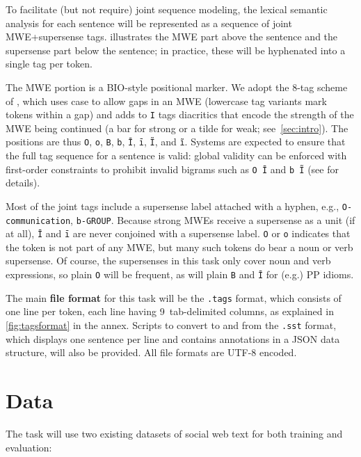 \documentclass[11pt]{article}
\newcommand{\shortversion}[1]{}
\newcommand{\longversion}[1]{#1} %
\begin{document}
\longversion{To facilitate (but not require) joint sequence modeling, 
the lexical semantic}\shortversion{The} analysis for each sentence will be represented as 
a sequence of joint MWE+supersense tags.  illustrates 
the MWE part above the sentence and the supersense part below\longversion{ the sentence}; 
in practice, these will be hyphenated into a single tag per token.

The MWE portion is a BIO-style \citep{ramshaw-95} 
positional marker. We adopt the 8-tag scheme of \citet{schneider-14}, 
which uses case to allow gaps in an MWE (lowercase tag variants mark 
tokens within a gap) and adds to \texttt{I} tags 
diacritics that encode the strength of the MWE being continued (a bar for strong or a tilde for weak; see~\cref{sec:intro}).
The positions are thus \texttt{O}, \texttt{o}, \texttt{B}, \texttt{b},
\texttt{Ī}, \texttt{ī}, \texttt{Ĩ}, and \texttt{ĩ}.
Systems are expected to ensure that the full tag sequence for a sentence is valid: 
global validity can be enforced with first-order constraints 
to prohibit invalid bigrams such as \texttt{O~Ī} and \texttt{b~Ĩ} (see \citealp{schneider-14} for details).

Most of the joint tags include a supersense label attached with a hyphen, 
e.g., \texttt{O-communication}, \texttt{b-GROUP}.
Because strong MWEs receive a supersense as a unit (if at all), 
\texttt{Ī} and \texttt{ī} are never conjoined with a supersense label.
\texttt{O} or \texttt{o} indicates that the token is not part of any MWE, 
but many such tokens do bear a noun or verb supersense.
\longversion{Of course, the supersenses in this task only cover noun and verb expressions, 
so plain \texttt{O} will be frequent, as will plain \texttt{B} and \texttt{Ī} for (e.g.) PP idioms.}

The main \textbf{file format} for this task will be the \texttt{.tags} format, 
which consists of one line per token, each line having 9~tab-delimited columns, 
as explained in \cref{fig:tagsformat} in the annex.
Scripts to convert to and from the \texttt{.sst} format, which displays one sentence per line 
and contains annotations in a JSON data structure, will also be provided.
\longversion{All file formats are UTF-8 encoded.}



\section{Data}\label{sec:data}

The task will use two existing datasets of social web text for both training and evaluation: 
\end{document}
